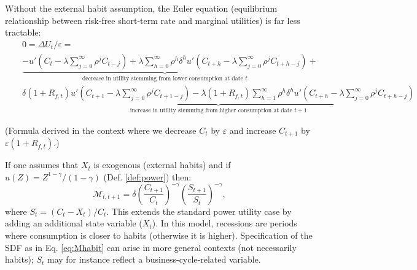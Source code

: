\documentclass[
  12pt,
]{book}
\theoremstyle{definition}
\theoremstyle{definition}
\theoremstyle{definition}
\theoremstyle{definition}
\theoremstyle{remark}
\begin{document}
Without the external habit assumption, the Euler equation (equilibrium relationship between risk-free short-term rate and marginal utilities) is far less tractable:
\begin{eqnarray*}
&& 0 = \Delta U_t / \varepsilon =\\
&& \underbrace{ - u'\left(C_{t} - \lambda \sum_{j=0}^\infty \rho^j C_{t-j}\right) + \lambda  \sum_{h=0}^{\infty} \rho^h \delta^{h}u'\left(C_{t+h} - \lambda \sum_{j=0}^\infty \rho^j C_{t+h-j}\right)}_{\mbox{decrease in utility stemming from lower consumption at date $t$}} +\\
&& \underbrace{\delta(1+R_{f,t}) u'\left(C_{t+1} - \lambda \sum_{j=0}^\infty \rho^j C_{t+1-j}\right) - \lambda (1+R_{f,t}) \sum_{h=1}^{\infty} \rho^h \delta^{h}u'\left(C_{t+h} - \lambda \sum_{j=0}^\infty \rho^j C_{t+h-j}\right)}_{\mbox{increase in utility stemming from higher consumption at date $t+1$}}
\end{eqnarray*}

(Formula derived in the context where we decrease \(C_t\) by \(\varepsilon\) and increase \(C_{t+1}\) by \(\varepsilon(1+R_{f,t})\).)

If one assumes that \(X_t\) is exogenous (external habits) and if \(u(Z)=Z^{1-\gamma}/(1-\gamma)\) (Def. \ref{def:power}) then:
\begin{equation}
\mathcal{M}_{t,t+1} = \delta \left( \frac{C_{t+1}}{C_t} \right)^{-\gamma}\left( \frac{S_{t+1}}{S_t} \right)^{-\gamma},\label{eq:Mhabit}
\end{equation}
where \(S_t = (C_t - X_t)/C_t\).
This extends the standard power utility case by adding an additional state variable (\(X_t\)).
In this model, recessions are periods where consumption is closer to habits (otherwise it is higher).
Specification of the SDF as in Eq. \eqref{eq:Mhabit} can arise in more general contexts (not necessarily habits); \(S_t\) may for instance reflect a business-cycle-related variable.
\end{document}
